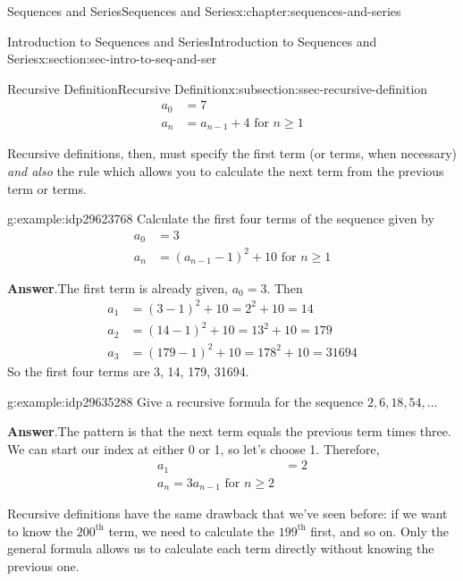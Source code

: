 \documentclass[twoside,10pt,]{book}
\newcommand{\blocktitlefont}{\relax}
\numberwithin{equation}{section}
\newcommand{\upth}[1]{{#1^{\text{th}}}}
\newcommand{\amp}{&}
\begin{document}
\begin{chapterptx}{Sequences and Series}{}{Sequences and Series}{}{}{x:chapter:sequences-and-series}
\begin{sectionptx}{Introduction to Sequences and Series}{}{Introduction to Sequences and Series}{}{}{x:section:sec-intro-to-seq-and-ser}
\begin{subsectionptx}{Recursive Definition}{}{Recursive Definition}{}{}{x:subsection:ssec-recursive-definition}
\begin{align*}
{a_0} \amp = 7\\
{a_n} \amp = {a_{n - 1}} + 4 \text{ for } n \ge 1
\end{align*}
%
\par
Recursive definitions, then, must specify the first term (or terms, when necessary) \emph{and also} the rule which allows you to calculate the next term from the previous term or terms. \begin{example}{}{g:example:idp29623768}%
Calculate the first four terms of the sequence given by%
\begin{align*}
{a_0} \amp = 3\\
{a_n} \amp = {\left( {{a_{n - 1}} - 1} \right)^2} + 10 \text{ for } n \ge 1
\end{align*}
\par\smallskip%
\noindent\textbf{\blocktitlefont Answer}.\label{g:answer:idp29625944}{}\hypertarget{g:answer:idp29625944}{}\quad{}The first term is already given, \(a_0=3\).  Then%
\begin{align*}
{a_1} \amp = {\left( {3 - 1} \right)^2} + 10 = {2^2} + 10 = 14\\
{a_2} \amp = {\left( {14 - 1} \right)^2} + 10 = {13^2} + 10 = 179\\
{a_3} \amp = {\left( {179 - 1} \right)^2} + 10 = {178^2} + 10 = 31694
\end{align*}
So the first four terms are 3, 14, 179, 31694.\end{example}
 \begin{example}{}{g:example:idp29635288}%
Give a recursive formula for the sequence \(2, 6, 18, 54, \ldots\)\par\smallskip%
\noindent\textbf{\blocktitlefont Answer}.\label{g:answer:idp29633880}{}\hypertarget{g:answer:idp29633880}{}\quad{}The pattern is that the next term equals the previous term times three.  We can start our index at either 0 or 1, so let's choose 1.  Therefore,%
\begin{align*}
{a_1} \amp = 2\\
{a_n} = 3{a_{n - 1}} \text{ for } n \ge 2
\end{align*}
\end{example}
%
\par
Recursive definitions have the same drawback that we've seen before:  if we want to know the \(\upth{200}\) term, we need to calculate the \(\upth{199}\) first, and so on.  Only the general formula allows us to calculate each term directly without knowing the previous one.%
\end{subsectionptx}

\end{sectionptx}
\end{chapterptx}
\end{document}
